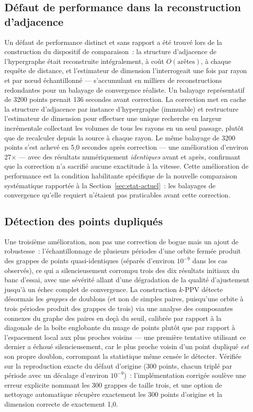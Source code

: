 \documentclass[11pt,a4paper]{article}
\begin{document}
\subsection{Défaut de performance dans la reconstruction d'adjacence}

Un défaut de performance distinct et sans rapport a été trouvé lors de la
construction du dispositif de comparaison~: la structure d'adjacence de
l'hypergraphe était reconstruite intégralement, à coût $O(\text{arêtes})$,
à chaque requête de distance, et l'estimateur de dimension l'interrogeait
une fois par rayon et par nœud échantillonné --- s'accumulant en milliers
de reconstructions redondantes pour un balayage de convergence réaliste.
Un balayage représentatif de 3200 points prenait 136 secondes avant
correction. La correction met en cache la structure d'adjacence par
instance d'hypergraphe (immuable) et restructure l'estimateur de dimension
pour effectuer une unique recherche en largeur incrémentale collectant les
volumes de tous les rayons en un seul passage, plutôt que de recalculer
depuis la source à chaque rayon. Le même balayage de 3200 points s'est
achevé en 5,0 secondes après correction --- une amélioration d'environ
27$\times$ --- avec des résultats numériquement \emph{identiques} avant et
après, confirmant que la correction n'a sacrifié aucune exactitude à la
vitesse. Cette amélioration de performance est la condition habilitante
spécifique de la nouvelle comparaison systématique rapportée à la
Section~\ref{sec:etat-actuel}~: les balayages de convergence qu'elle
requiert n'étaient pas praticables avant cette correction.

\subsection{Détection des points dupliqués}

Une troisième amélioration, non pas une correction de bogue mais un ajout
de robustesse~: l'échantillonnage de plusieurs périodes d'une orbite
fermée produit des grappes de points quasi-identiques (séparés
d'environ $10^{-9}$ dans les cas observés), ce qui a silencieusement
corrompu trois des dix résultats initiaux du banc d'essai, avec une
sévérité allant d'une dégradation de la qualité d'ajustement jusqu'à un
échec complet de convergence. La construction $k$-PPV détecte désormais
les \emph{grappes} de doublons (et non de simples paires, puisqu'une
orbite à trois périodes produit des grappes de trois) via une analyse des
composantes connexes du graphe des paires en deçà du seuil, calibrée par
rapport à la diagonale de la boîte englobante du nuage de points plutôt
que par rapport à l'espacement local aux plus proches voisins --- une
première tentative utilisant ce dernier a échoué silencieusement, car le
plus proche voisin d'un point dupliqué \emph{est} son propre doublon,
corrompant la statistique même censée le détecter. Vérifiée sur la
reproduction exacte du défaut d'origine (300 points, chacun triplé par
période avec un décalage d'environ $10^{-9}$)~: l'implémentation corrigée
soulève une erreur explicite nommant les 300 grappes de taille trois, et
une option de nettoyage automatique récupère exactement les 300 points
d'origine et la dimension correcte de exactement 1,0.
\end{document}

